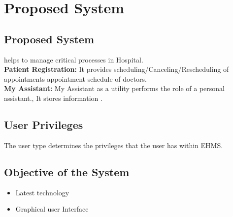 \chapter{Proposed System}


\section{Proposed System}
helps to manage critical processes in Hospital.\\
\textbf{Patient Registration:} 
 It provides scheduling/Canceling/Rescheduling of appointments appointment schedule of doctors.\\


\textbf{My Assistant:}
 My Assistant as a utility performs the role of a personal assistant., It stores information .\\



\section{User Privileges}
The user type determines the privileges that the user has within EHMS.\\


\section{Objective of the System}

\begin{itemize}
\item Latest technology 
\item Graphical user Interface
\end{itemize}